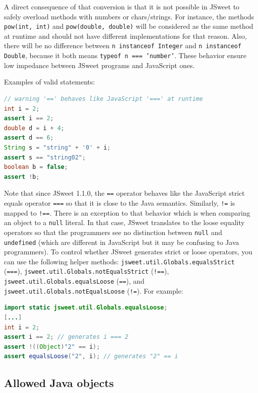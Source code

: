 \documentclass[a4paper]{report}
\begin{document}
A direct consequence of that conversion is that it is not possible in JSweet to safely overload methods with numbers or chars/strings. For instance, the methods \texttt{pow(int, int)} and \texttt{pow(double, double)} will be considered as the same method at runtime and should not have different implementations for that reason. Also, there will be no difference between \texttt{n instanceof Integer} and \texttt{n instanceof Double}, because it both means \texttt{typeof n === 'number'}. These behavior ensure low impedance between JSweet programs and JavaScript ones.

\noindent
Examples of valid statements:

\begin{lstlisting}[language=Java]
// warning '==' behaves like JavaScript '===' at runtime
int i = 2;
assert i == 2;
double d = i + 4;
assert d == 6;
String s = "string" + '0' + i;
assert s == "string02";
boolean b = false;
assert !b;
\end{lstlisting}

Note that since JSweet 1.1.0, the \texttt{==} operator behaves like the JavaScript strict equals operator \texttt{===} so that it is close to the Java semantics. Similarly, \texttt{!=} is mapped to \texttt{!==}. There is an exception to that behavior which is when comparing an object to a \texttt{null} literal. In that case, JSweet translates to the loose equality operators so that the programmers see no distinction between \texttt{null} and \texttt{undefined} (which are different in JavaScript but it may be confusing to Java programmers). To control whether JSweet generates strict or loose operators, you can use the following helper methods: \texttt{jsweet.\-util.\-Globals.\-equalsStrict} (\texttt{===}), \texttt{jsweet.\-util.\-Globals.\-notEqualsStrict} (\texttt{!==}), \texttt{jsweet.\-util.\-Globals.\-equalsLoose} (\texttt{==}), and  \texttt{jsweet.\-util.\-Globals.\-notEqualsLoose} (\texttt{!=}). For example:

\begin{lstlisting}[language=Java]
import static jsweet.util.Globals.equalsLoose;
[...]
int i = 2;
assert i == 2; // generates i === 2
assert !((Object)"2" == i);
assert equalsLoose("2", i); // generates "2" == i
\end{lstlisting}

\subsection{Allowed Java objects}
\end{document}
